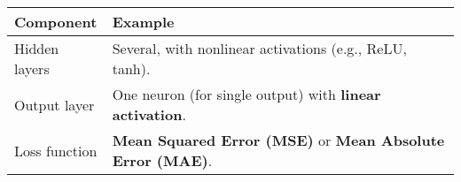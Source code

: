 \begin{table}[!htp]
    \centering
    \begin{tabular}{@{} l p{24em} @{}}
        \toprule
        \textbf{Component} & \textbf{Example} \\
        \midrule
        Hidden layers   & Several, with nonlinear activations (e.g., ReLU, tanh). \\[.3em]
        Output layer    & One neuron (for single output) with \textbf{linear activation}. \\[.3em]
        Loss function   & \textbf{Mean Squared Error (MSE)} or \textbf{Mean Absolute Error (MAE)}. \\
        \bottomrule
    \end{tabular}
\end{table}